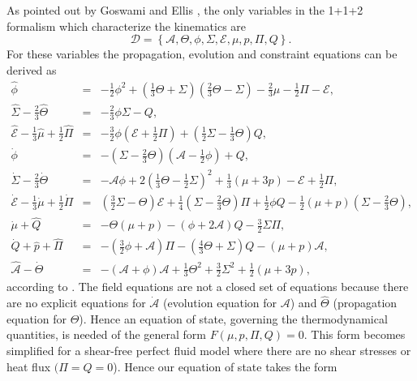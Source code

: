 \documentclass[abstract=on,notitlepage,superscriptaddress,nofootinbib,aps,preprint,prd]{revtex4}
\newcommand{\0}{^{(0)}}
\newcommand{\1}{^{(1)}}
\newcommand{\2}{^{(2)}}
\newcommand{\3}{{}^{(3)}}
\begin{document}
As pointed out by Goswami and Ellis \cite{birkhoff}, the only variables in the 1+1+2 formalism which characterize the kinematics are  
\begin{equation} \label{setD}
\mathcal{D} = \left\{\mathcal{A},\Theta,\phi,\Sigma,\mathcal{E},\mu,p,\Pi,Q\right\}.
\end{equation}
For these variables the propagation, evolution and constraint equations can be derived as
\begin{eqnarray}
\label{LRSstart}
	\hat{\phi} &=& -\frac{1}{2}\phi^2+\left(\frac{1}{3}\Theta+\Sigma\right)\left(\frac{2}{3}\Theta - \Sigma\right) -\frac{2}{3}\mu-\frac{1}{2}\Pi-\mathcal{E},\label{A}\\	
	\hat{\Sigma}-\frac{2}{3}\hat{\Theta} &=&-\frac{2}{3}\phi\Sigma-Q,\label{B}\\	
	\hat{\mathcal{E}}-\frac{1}{3}\hat{\mu}+\frac{1}{2}\hat{\Pi} &=&-\frac{3}{2}\phi\left(\mathcal{E}+\frac{1}{2}\Pi\right)+\left(\frac{1}{2}\Sigma-\frac{1}{3}\Theta\right)Q,\label{C}\\	
	\dot{\phi}&=&-\left(\Sigma-\frac{2}{3}\Theta\right)\left(\mathcal{A}-\frac{1}{2}\phi\right)+Q,\label{D}\\	
	\dot{\Sigma}-\frac{2}{3}\dot{\Theta}&=&-\mathcal{A}\phi+2\left(\frac{1}{3}\Theta-\frac{1}{2}\Sigma\right)^2 +\frac{1}{3}(\mu+3p)-\mathcal{E}+\frac{1}{2}\Pi,\label{E} \\	
	\dot{\mathcal{E}}-\frac{1}{3}\dot{\mu}+\frac{1}{2}\dot{\Pi}&=&\left(\frac{3}{2}\Sigma-\Theta\right)\mathcal{E}+\frac{1}{4}\left(\Sigma-\frac{2}{3}\Theta\right)\Pi +\frac{1}{2}\phi Q-\frac{1}{2}(\mu+p)\left(\Sigma-\frac{2}{3}\Theta\right),\label{F}\\	
	\dot{\mu}+\hat{Q}&=& -\Theta(\mu+p)-(\phi+2\mathcal{A})Q-\frac{3}{2}\Sigma\Pi,\label{G}\\	
	\dot{Q}+\hat{p}+\hat{\Pi}&=&-\left(\frac{3}{2}\phi+\mathcal{A}\right)\Pi-\left(\frac{4}{3}\Theta+\Sigma\right)Q-(\mu+p)\mathcal{A},\label{H}\\	
	\label{LRSend}
	\hat{\mathcal{A}}-\dot{\Theta}&=&-(\mathcal{A}+\phi)\mathcal{A}+\frac{1}{3}\Theta^2 +\frac{3}{2}\Sigma^2+\frac{1}{2}\left(\mu+3p\right)\label{I},
\end{eqnarray}
according to \cite{clarkson2007}. The field equations are not a closed set of equations because there are no explicit equations for $\dot{\mathcal{A}}$ (evolution equation for $\mathcal{A}$) and $\hat{\Theta}$ (propagation equation for $\Theta$). Hence  an equation of state, governing the thermodynamical quantities, is needed of the general form $F(\mu,p,\Pi,Q)=0$. This form becomes simplified for a shear-free perfect fluid model where there are no shear stresses or heat flux $(\Pi = Q =0$). Hence our equation of state takes the form
\end{document}
